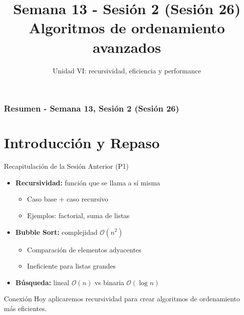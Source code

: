 \documentclass[10pt]{beamer}
\title[Semana 13 - P2]{Semana 13 - Sesión 2 (Sesión 26)\\Algoritmos de ordenamiento avanzados}
\subtitle{Unidad VI: recursividad, eficiencia y performance}
\begin{document}
\myfront{}

\begin{frame}
  \titlepage
\end{frame}

\begin{frame}
  \frametitle{Resumen - Semana 13, Sesión 2 (Sesión 26)}
  \tableofcontents
\end{frame}

\section{Introducción y Repaso}

\begin{frame}{Recapitulación de la Sesión Anterior (P1)}
  \begin{itemize}
    \item \textbf{Recursividad:} función que se llama a sí misma
      \begin{itemize}
        \item Caso base + caso recursivo
        \item Ejemplos: factorial, suma de listas
      \end{itemize}
    \item \textbf{Bubble Sort:} complejidad $\mathcal{O}(n^2)$
      \begin{itemize}
        \item Comparación de elementos adyacentes
        \item Ineficiente para listas grandes
      \end{itemize}
    \item \textbf{Búsqueda:} lineal $\mathcal{O}(n)$ vs binaria $\mathcal{O}(\log n)$
  \end{itemize}
  
  \begin{alertblock}{Conexión}
    Hoy aplicaremos recursividad para crear algoritmos de ordenamiento más eficientes.
  \end{alertblock}
\end{frame}
\end{document}
